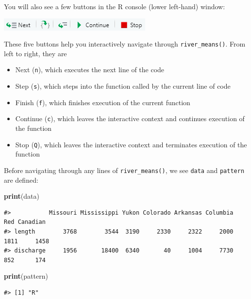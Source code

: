 \documentclass[
]{book}
\newenvironment{Shaded}{\begin{snugshade}}{\end{snugshade}}
\newcommand{\KeywordTok}[1]{\textcolor[rgb]{0.13,0.29,0.53}{\textbf{#1}}}
\newcommand{\NormalTok}[1]{#1}
\providecommand{\tightlist}{%
  \setlength{\itemsep}{0pt}\setlength{\parskip}{0pt}}
\begin{document}
You will also see a few buttons in the R console (lower left-hand) window:

\includegraphics[width=0.75\linewidth]{images/newrpack_files8}

These five buttons help you interactively navigate through \texttt{river\_means()}. From left to right, they are

\begin{itemize}
\tightlist
\item
  Next (\texttt{n}), which executes the next line of the code
\item
  Step (\texttt{s}), which steps into the function called by the current line of code
\item
  Finish (\texttt{f}), which finishes execution of the current function
\item
  Continue (\texttt{c}), which leaves the interactive context and continues execution of the function
\item
  Stop (\texttt{Q}), which leaves the interactive context and terminates execution of the function
\end{itemize}

Before navigating through any lines of \texttt{river\_means()}, we see \texttt{data} and \texttt{pattern} are defined:

\begin{Shaded}
\begin{Highlighting}[]
\KeywordTok{print}\NormalTok{(data)}
\end{Highlighting}
\end{Shaded}

\begin{verbatim}
#>           Missouri Mississippi Yukon Colorado Arkansas Columbia  Red Canadian
#> length        3768        3544  3190     2330     2322     2000 1811     1458
#> discharge     1956       18400  6340       40     1004     7730  852      174
\end{verbatim}

\begin{Shaded}
\begin{Highlighting}[]
\KeywordTok{print}\NormalTok{(pattern)}
\end{Highlighting}
\end{Shaded}

\begin{verbatim}
#> [1] "R"
\end{verbatim}
\end{document}
